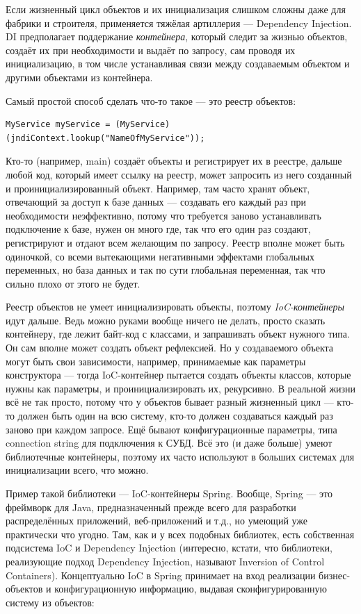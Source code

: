 \documentclass{../../text-style}
\begin{document}
Если жизненный цикл объектов и их инициализация слишком сложны даже для фабрики и строителя, применяется тяжёлая артиллерия --- Dependency Injection. DI предполагает поддержание \textit{контейнера}, который следит за жизнью объектов, создаёт их при необходимости и выдаёт по запросу, сам проводя их инициализацию, в том числе устанавливая связи между создаваемым объектом и другими объектами из контейнера.

Самый простой способ сделать что-то такое --- это реестр объектов:

\begin{verbatim}
MyService myService = (MyService)(jndiContext.lookup("NameOfMyService"));
\end{verbatim}

Кто-то (например, main) создаёт объекты и регистрирует их в реестре, дальше любой код, который имеет ссылку на реестр, может запросить из него созданный и проинициализированный объект. Например, там часто хранят объект, отвечающий за доступ к базе данных --- создавать его каждый раз при необходимости неэффективно, потому что требуется заново устанавливать подключение к базе, нужен он много где, так что его один раз создают, регистрируют и отдают всем желающим по запросу. Реестр вполне может быть одиночкой, со всеми вытекающими негативными эффектами глобальных переменных, но база данных и так по сути глобальная переменная, так что сильно плохо от этого не будет.

Реестр объектов не умеет инициализировать объекты, поэтому \textit{IoC-контейнеры} идут дальше. Ведь можно руками вообще ничего не делать, просто сказать контейнеру, где лежит байт-код с классами, и запрашивать объект нужного типа. Он сам вполне может создать объект рефлексией. Но у создаваемого объекта могут быть свои зависимости, например, принимаемые как параметры конструктора --- тогда IoC-контейнер пытается создать объекты классов, которые нужны как параметры, и проинициализировать их, рекурсивно. В реальной жизни всё не так просто, потому что у объектов бывает разный жизненный цикл --- кто-то должен быть один на всю систему, кто-то должен создаваться каждый раз заново при каждом запросе. Ещё бывают конфигурационные параметры, типа connection string для подключения к СУБД. Всё это (и даже больше) умеют библиотечные контейнеры, поэтому их часто используют в больших системах для инициализации всего, что можно.

Пример такой библиотеки --- IoC-контейнеры Spring. Вообще, Spring --- это фреймворк для Java, предназначенный прежде всего для разработки распределённых приложений, веб-приложений и т.д., но умеющий уже практически что угодно. Там, как и у всех подобных библиотек, есть собственная подсистема IoC и Dependency Injection (интересно, кстати, что библиотеки, реализующие подход Dependency Injection, называют Inversion of Control Containers). Концептуально IoC в Spring принимает на вход реализации бизнес-объектов и конфигурационную информацию, выдавая сконфигурированную систему из объектов:
\end{document}
